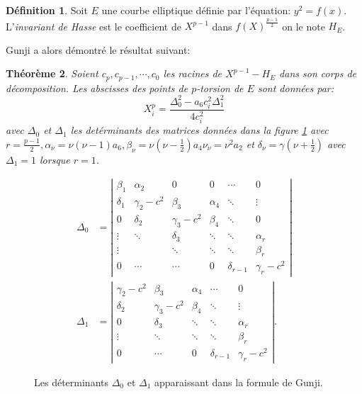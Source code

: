 \documentclass[10pt,a4paper]{book}
\theoremstyle{plain}
\newtheorem{thm}{Théorème}
\theoremstyle{definition}
\theoremstyle{definition}
\theoremstyle{definition}
\theoremstyle{definition}
\newtheorem{defi}[thm]{Définition}
\theoremstyle{remark}
\theoremstyle{remark}
\begin{document}
\begin{defi}
Soit $E$ une courbe elliptique définie par l'équation: $y^2=f(x)$. L'\emph{invariant de Hasse} est le coefficient de $X^{p-1}$ dans $f(X)^{\frac{p-1}{2}}$ on le note $H_{E}$.
\end{defi}

Gunji a alors démontré le résultat suivant:

\begin{thm}
\label{thm:Gunji}
Soient $c_p, c_{p-1}, \cdots, c_{0}$ les racines de $X^{p-1}-H_{E}$ dans son corps de décomposition. Les abscisses des points de $p$-torsion de $E$ sont données par: 
\begin{equation*}
X^{p}_i=\frac{\Delta_0^2-a_6c_i^2\Delta_1^2}{4c_i^2}
\end{equation*}
avec $\Delta_0$ et $\Delta_1$ les detérminants des matrices données dans la figure \ref{fig:gun:det} avec $r=\frac{p-1}{2}, \alpha_{\nu}=\nu (\nu -1 ) a_6, \beta_{\nu}=\nu(\nu-\frac{1}{2})a_4 \nu_{\nu}=\nu^2a_2$ et $\delta_{\nu}=\gamma(\nu + \frac{1}{2})$ avec $\Delta_1=1$ lorsque $r=1$.
\end{thm}

\begin{figure}
\label{fig:gun:det}
\begin{equation*}
\begin{alignedat}{1}
\Delta_0 &=\left| 
\begin{matrix}
\beta_1 & \alpha_2 & 0 & 0 & \cdots & 0\\
\delta_1 & \gamma_2 - c^2 & \beta_3 & \alpha_4 & \ddots & \vdots \\
0 & \delta_2 & \gamma_3 - c^2 & \beta_4 & \ddots & 0 \\
\vdots & \ddots & \delta_3 & \ddots & \ddots & \alpha_r \\
\vdots & & \ddots  & \ddots & \ddots & \beta_r \\
0 & \cdots & \cdots & 0 & \delta_{r-1} & \gamma_r - c^2 
\end{matrix}
\right| \\
\Delta_1 &= \left| 
\begin{matrix}
\gamma_2-c^2 & \beta_3 & \alpha_4 & \cdots & 0 \\
\delta_2 & \gamma_3 - c^2 & \beta_4 & \ddots & \vdots \\
0 & \delta_3 & \ddots & \ddots & \alpha_r \\
\vdots & \ddots & \ddots & \ddots & \beta_r \\
0 & \cdots & 0 & \delta_{r-1} & \gamma_r-c^2
\end{matrix}
\right|.
\end{alignedat}
\end{equation*}
\caption{Les déterminants $\Delta_0$ et $\Delta_1$ apparaissant dans la formule de Gunji.}
\end{figure}
\end{document}
